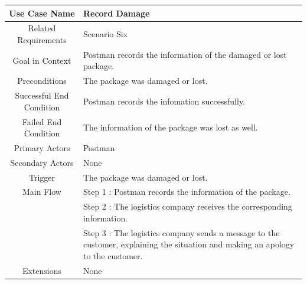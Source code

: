 \documentclass[12pt]{scrreprt}
\begin{document}
\begin{table}[H]
  \centering
  \begin{tabular}{| c | p{11cm} |}
    \hline
    Use Case Name & Record Damage\\
    \hline
    Related Requirements & Scenario Six\\
    \hline
    Goal in Context & Postman records the information of the damaged or
    lost package.\\
    \hline
    Preconditions & The package was damaged or lost.\\
    \hline
    Successful End Condition & Postman records the infomation successfully.\\
    \hline
    Failed End Condition & The information of the package was lost as well.\\
    \hline
    Primary Actors & Postman\\
    \hline
    Secondary Actors & None\\
    \hline
    Trigger & The package was damaged or lost.\\
    \hline
    Main Flow & Step 1 : Postman records the information of the package.\\
    & Step 2 : The logistics company receives the corresponding information.\\
    & Step 3 : The logistics company sends a message to the customer,
    explaining the situation and making an apology to the customer.\\
    \hline
    Extensions & None\\
    \hline
  \end{tabular}
\end{table}
\end{document}
